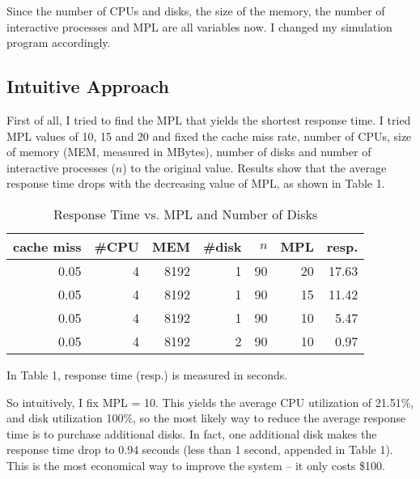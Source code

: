 \documentclass[12pt,letterpaper]{article}
\begin{document}
Since the number of CPUs and disks, the size of the memory, the number of interactive processes and MPL are all variables now. I changed my simulation program accordingly.

\subsection{Intuitive Approach}
First of all, I tried to find the MPL that yields the shortest response time. I tried MPL values of 10, 15 and 20 and fixed the cache miss rate, number of CPUs, size of memory (MEM, measured in MBytes), number of disks and number of interactive processes ($n$) to the original value. Results show that the average response time drops with the decreasing value of MPL, as shown in Table 1.
\begin{table}
\begin{center}
\caption{Response Time vs. MPL and Number of Disks}
\vspace{0.5ex}
\begin{tabular}{r|r|r|r|r|r|r}
cache miss & \#CPU & MEM & \#disk & $n$ & MPL & resp.\\
\hline
0.05 & 4 & 8192 & 1 & 90 & 20 & 17.63\\
0.05 & 4 & 8192 & 1 & 90 & 15 & 11.42\\
0.05 & 4 & 8192 & 1 & 90 & 10 & 5.47\\
0.05 & 4 & 8192 & 2 & 90 & 10 & 0.97\\
\end{tabular}
\end{center}
\end{table}
In Table 1, response time (resp.) is measured in seconds.

So intuitively, I fix MPL = 10. This yields the average CPU utilization of 21.51\%, and disk utilization 100\%, so the most likely way to reduce the average response time is to purchase additional disks. In fact, one additional disk makes the response time drop to 0.94 seconds (less than 1 second, appended in Table 1). This is the most economical way to improve the system -- it only costs \$100.
\end{document}
